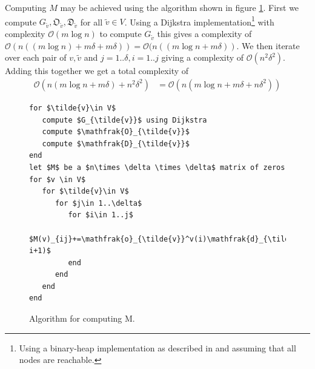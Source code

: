 \documentclass{article}
\begin{document}
Computing $M$ may be achieved using the algorithm shown in figure \ref{alg:compute_M}. First we compute $G_{\tilde{v}},\mathfrak{O}_{\tilde{v}},\mathfrak{D}_{\tilde{v}}$ for all $\tilde{v}\in V$. Using a Dijkstra implementation\footnote{Using a binary-heap implementation as described in \cite{alg-bible} and assuming that all nodes are reachable.} with complexity $\mathcal{O}(m\log n)$ to compute $G_{\tilde{v}}$ this gives a complexity of $\mathcal{O}(n((m\log n) + m\delta + m\delta)) = \mathcal{O}(n((m\log n + m\delta))$. We then iterate over each pair of $v,\tilde{v}$ and $j=1..\delta,i=1..j$ giving a complexity of $\mathcal{O}(n^2\delta^2)$. Adding this together we get a total complexity of
\begin{align}
\mathcal{O}(n(m\log n + m\delta) + n^2\delta^2)&=\mathcal{O}(n(m\log n + m\delta + n\delta^2))
\end{align}

\begin{figure}[H]
\begin{lstlisting}
for $\tilde{v}\in V$
   compute $G_{\tilde{v}}$ using Dijkstra
   compute $\mathfrak{O}_{\tilde{v}}$
   compute $\mathfrak{D}_{\tilde{v}}$
end
let $M$ be a $n\times \delta \times \delta$ matrix of zeros
for $v \in V$
   for $\tilde{v}\in V$ 
      for $j\in 1..\delta$
         for $i\in 1..j$
            $M(v)_{ij}+=\mathfrak{o}_{\tilde{v}}^v(i)\mathfrak{d}_{\tilde{v}}^v(j-i+1)$
         end
      end
   end
end
\end{lstlisting}
\caption{Algorithm for computing M.}
\label{alg:compute_M}
\end{figure}
\end{document}
